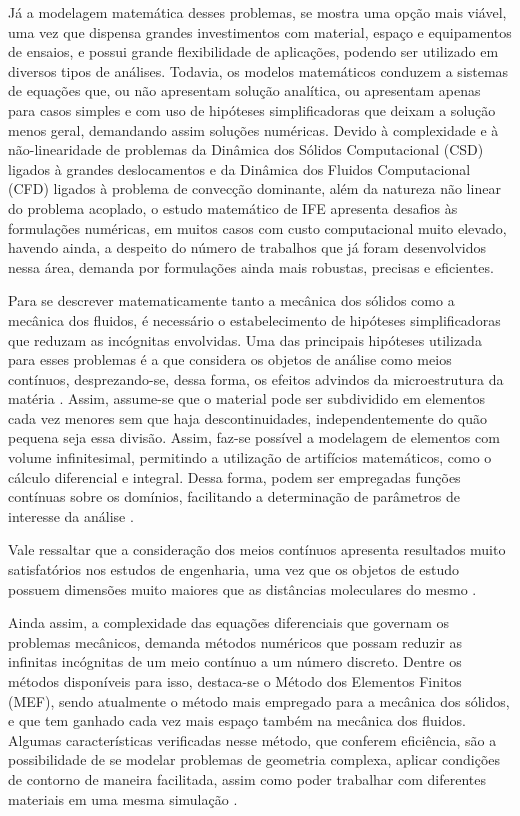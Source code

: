 Já a modelagem matemática desses problemas, se mostra uma opção mais viável, uma vez que dispensa grandes investimentos com material, espaço e equipamentos de ensaios, e possui grande flexibilidade de aplicações, podendo ser utilizado em diversos tipos de análises. Todavia, os modelos matemáticos conduzem a sistemas de equações que, ou não apresentam solução analítica, ou apresentam apenas para casos simples e com uso de hipóteses simplificadoras que deixam a solução menos geral, demandando assim soluções numéricas. Devido à complexidade e à não-linearidade de problemas da Dinâmica dos Sólidos Computacional (CSD) ligados à grandes deslocamentos e da Dinâmica dos Fluidos Computacional (CFD) ligados à problema de convecção dominante, além da natureza não linear do problema acoplado, o estudo matemático de IFE apresenta desafios às formulações numéricas, em muitos casos com custo computacional muito elevado, havendo ainda, a despeito do número de trabalhos que já foram desenvolvidos nessa área, demanda por formulações ainda mais robustas, precisas e eficientes.

Para se descrever matematicamente tanto a mecânica dos sólidos como a mecânica dos fluidos, é necessário o estabelecimento de hipóteses simplificadoras que reduzam as incógnitas envolvidas. Uma das principais hipóteses utilizada para esses problemas é a que considera os objetos de análise como meios contínuos, desprezando-se, dessa forma, os efeitos advindos da microestrutura da matéria \cite{lai2009introduction, mase2009continuum}. Assim, assume-se que o material pode ser subdividido em elementos cada vez menores sem que haja descontinuidades, independentemente do quão pequena seja essa divisão. Assim, faz-se possível a modelagem de elementos com volume infinitesimal, permitindo a utilização de artifícios matemáticos, como o cálculo diferencial e integral. Dessa forma, podem ser empregadas funções contínuas sobre os domínios, facilitando a determinação de parâmetros de interesse da análise \cite{irgens2008continuum, lai2009introduction, malvern1969introduction}.

Vale ressaltar que a consideração dos meios contínuos apresenta resultados muito satisfatórios nos estudos de engenharia, uma vez que os objetos de estudo possuem dimensões muito maiores que as distâncias moleculares do mesmo \cite{malvern1969introduction, mase2009continuum}.

Ainda assim, a complexidade das equações diferenciais que governam os problemas mecânicos, demanda métodos numéricos que possam reduzir as infinitas incógnitas de um meio contínuo a um número discreto. Dentre os métodos disponíveis para isso, destaca-se o Método dos Elementos Finitos (MEF), sendo atualmente o método mais empregado para a mecânica dos sólidos, e que tem ganhado cada vez mais espaço também na mecânica dos fluidos. Algumas características verificadas nesse método, que conferem eficiência, são a possibilidade de se modelar problemas de geometria complexa, aplicar condições de contorno de maneira facilitada, assim como poder trabalhar com diferentes materiais em uma mesma simulação \cite{anderson1995computational}.

